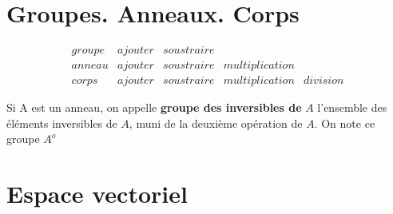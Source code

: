 \documentclass{book}
\begin{document}
\chapter{Groupes. Anneaux. Corps}
$$
\begin{array}{l|llll}
groupe & ajouter & soustraire &&\\
\hline
anneau & ajouter & soustraire & multiplication & \\
\hline
corps & ajouter & soustraire & multiplication & division
\end{array}
$$


Si A est un anneau, on appelle  {\bf groupe des inversibles de} $A$ l'ensemble des \'el\'ements inversibles de $A$, muni de la deuxi\`eme op\'eration de $A$.
On note ce groupe $A^o$

\chapter{Espace vectoriel}
\end{document}
